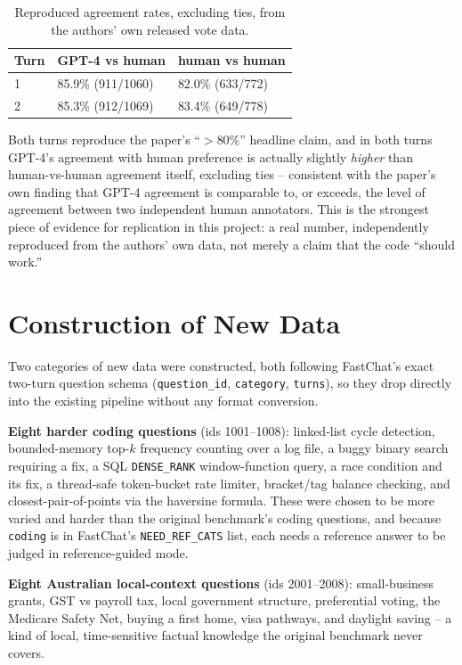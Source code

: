 \documentclass[11pt,twocolumn]{article}
\begin{document}
\begin{table}[h]
\centering
\small
\begin{tabular}{@{}lll@{}}
\toprule
\textbf{Turn} & \textbf{GPT-4 vs human} & \textbf{human vs human} \\
\midrule
1 & 85.9\% (911/1060) & 82.0\% (633/772) \\
2 & 85.3\% (912/1069) & 83.4\% (649/778) \\
\bottomrule
\end{tabular}
\caption{Reproduced agreement rates, excluding ties, from the authors' own released vote data.}
\label{tab:headline}
\end{table}

Both turns reproduce the paper's ``$>$80\%'' headline claim, and in both turns GPT-4's agreement
with human preference is actually slightly \emph{higher} than human-vs-human agreement itself,
excluding ties -- consistent with the paper's own finding that GPT-4 agreement is comparable to,
or exceeds, the level of agreement between two independent human annotators. This is the strongest
piece of evidence for replication in this project: a real number, independently reproduced from the
authors' own data, not merely a claim that the code ``should work.''

\section{Construction of New Data}

Two categories of new data were constructed, both following FastChat's exact two-turn question
schema (\texttt{question\_id}, \texttt{category}, \texttt{turns}), so they drop directly into the
existing pipeline without any format conversion.

\textbf{Eight harder coding questions} (ids 1001--1008): linked-list cycle detection, bounded-memory
top-$k$ frequency counting over a log file, a buggy binary search requiring a fix, a SQL
\texttt{DENSE\_RANK} window-function query, a race condition and its fix, a thread-safe token-bucket
rate limiter, bracket/tag balance checking, and closest-pair-of-points via the haversine formula.
These were chosen to be more varied and harder than the original benchmark's coding questions, and
because \texttt{coding} is in FastChat's \texttt{NEED\_REF\_CATS} list, each needs a reference
answer to be judged in reference-guided mode.

\textbf{Eight Australian local-context questions} (ids 2001--2008): small-business grants, GST vs
payroll tax, local government structure, preferential voting, the Medicare Safety Net, buying a
first home, visa pathways, and daylight saving -- a kind of local, time-sensitive factual knowledge
the original benchmark never covers.
\end{document}

